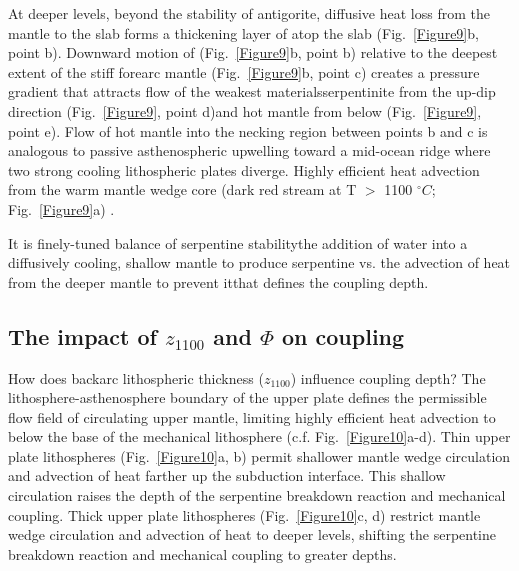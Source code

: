 \documentclass[draft]{agujournal2019}
\begin{document}
At deeper levels, beyond the stability of antigorite, diffusive heat loss from the mantle to the slab forms a thickening layer of  atop the slab (Fig.~\ref{Figure9}b, point b). Downward motion of  (Fig.~\ref{Figure9}b, point b) relative to the deepest extent of the stiff forearc mantle (Fig.~\ref{Figure9}b, point c) creates a pressure gradient that attracts flow of the weakest materials\textemdash serpentinite from the up-dip direction (Fig.~\ref{Figure9}, point d)\textemdash and hot mantle from below (Fig.~\ref{Figure9}, point e). Flow of hot mantle into the necking region between points b and c is analogous to passive asthenospheric upwelling toward a mid-ocean ridge where two strong cooling lithospheric plates diverge. Highly efficient heat advection from the warm mantle wedge core (dark red stream at T $>$ 1100 $^{\circ}C$; Fig.~\ref{Figure9}a) .

It is  finely-tuned balance of serpentine stability\textemdash the addition of water into a diffusively cooling, shallow mantle to produce serpentine vs. the advection of heat from the deeper mantle to prevent it\textemdash that defines the coupling depth.

\subsection{The impact of $z_{1100}$ and $\Phi$ on coupling}
How does backarc lithospheric thickness ($z_{1100}$) influence coupling depth? The lithosphere\allowbreak-asthenosphere boundary of the upper plate defines the permissible flow field of circulating upper mantle, limiting highly efficient heat advection to below the base of the mechanical lithosphere (c.f. Fig.~\ref{Figure10}a-d). Thin upper plate lithospheres (Fig.~\ref{Figure10}a, b) permit shallower mantle wedge circulation and advection of heat farther up the subduction interface. This shallow circulation raises the depth of the serpentine breakdown reaction and mechanical coupling. Thick upper plate lithospheres (Fig.~\ref{Figure10}c, d) restrict mantle wedge circulation and advection of heat to deeper levels, shifting the serpentine breakdown reaction and mechanical coupling to greater depths.
\end{document}
